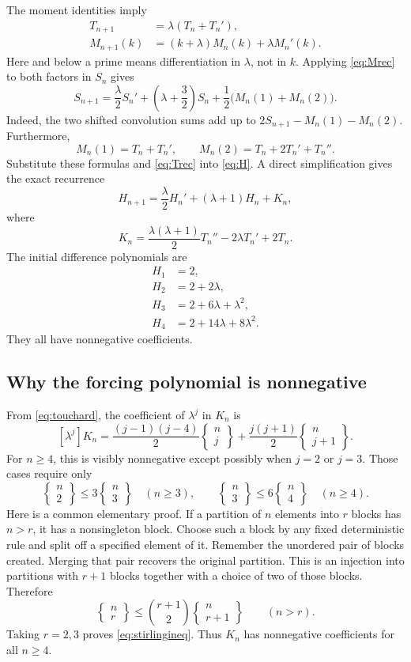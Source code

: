 \documentclass[11pt]{article}
\numberwithin{equation}{section}
\theoremstyle{definition}
\theoremstyle{remark}
\newcommand{\ST}[2]{\left\{\begin{matrix}#1\\#2\end{matrix}\right\}}
\begin{document}
The moment identities imply
\begin{align}
 T_{n+1}&=\lambda(T_n+T_n'),\label{eq:Trec}\\
 M_{n+1}(k)&=(k+\lambda)M_n(k)+\lambda M_n'(k).\label{eq:Mrec}
\end{align}
Here and below a prime means differentiation in $\lambda$, not in $k$.
Applying \eqref{eq:Mrec} to both factors in $S_n$ gives
\begin{equation}\label{eq:Srec}
 S_{n+1}=\frac\lambda2 S_n'
          +\left(\lambda+\frac32\right)S_n
          +\frac12\bigl(M_n(1)+M_n(2)\bigr).
\end{equation}
Indeed, the two shifted convolution sums add up to
$2S_{n+1}-M_n(1)-M_n(2)$. Furthermore,
\[
 M_n(1)=T_n+T_n',\qquad
 M_n(2)=T_n+2T_n'+T_n''.
\]
Substitute these formulas and \eqref{eq:Trec} into \eqref{eq:H}. A direct
simplification gives the exact recurrence
\begin{equation}\label{eq:Hrec}
 H_{n+1}=\frac\lambda2 H_n'+(\lambda+1)H_n+K_n,
\end{equation}
where
\begin{equation}\label{eq:K}
 K_n=\frac{\lambda(\lambda+1)}2T_n''-2\lambda T_n'+2T_n.
\end{equation}
The initial difference polynomials are
\begin{align*}
 H_1&=2,\\
 H_2&=2+2\lambda,\\
 H_3&=2+6\lambda+\lambda^2,\\
 H_4&=2+14\lambda+8\lambda^2.
\end{align*}
They all have nonnegative coefficients.

\subsection{Why the forcing polynomial is nonnegative}

From \eqref{eq:touchard}, the coefficient of $\lambda^j$ in $K_n$ is
\begin{equation}\label{eq:Kcoeff}
 [\lambda^j]K_n
 =\frac{(j-1)(j-4)}2\ST nj
   +\frac{j(j+1)}2\ST n{j+1}.
\end{equation}
For $n\ge4$, this is visibly nonnegative except possibly when $j=2$ or
$j=3$. Those cases require only
\begin{equation}\label{eq:stirlingineq}
 \ST n2\le3\ST n3\quad(n\ge3),\qquad
 \ST n3\le6\ST n4\quad(n\ge4).
\end{equation}
Here is a common elementary proof. If a partition of $n$ elements into
$r$ blocks has $n>r$, it has a nonsingleton block. Choose such a block by
any fixed deterministic rule and split off a specified element of it.
Remember the unordered pair of blocks created. Merging that pair
recovers the original partition. This is an injection into partitions
with $r+1$ blocks together with a choice of two of those blocks. Therefore
\begin{equation}\label{eq:mergeineq}
 \ST nr\le\binom{r+1}{2}\ST n{r+1}\qquad(n>r).
\end{equation}
Taking $r=2,3$ proves \eqref{eq:stirlingineq}.
Thus $K_n$ has nonnegative coefficients for all $n\ge4$.
\end{document}
